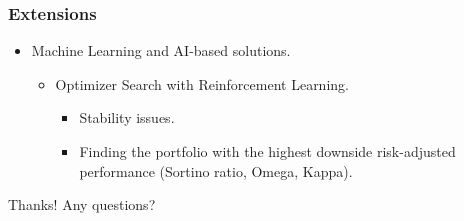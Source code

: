 \documentclass[pdf,10pt,xcolor=dvipsnames,hide notes]{beamer}
\begin{document}
		\begin{frame}[label=frame9e]
		\frametitle{Extensions}
		
	
	\setlength{\parskip}{15pt}
		
		\begin{itemize}
			\setlength{\parskip}{5pt}
			\item Machine Learning and AI-based solutions. 
			\begin{itemize}
				\item Optimizer Search with Reinforcement Learning.
				\begin{itemize}
					\item Stability issues.
					\item Finding the portfolio with the highest downside risk-adjusted performance (Sortino ratio, Omega, Kappa).
				\end{itemize}
			\end{itemize}
		
		\end{itemize}
	
		
		\end{frame}


\begin{frame}

\centering
\Large{Thanks! Any questions?}

\end{frame}
\end{document}
